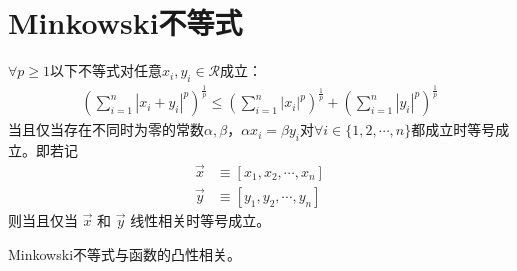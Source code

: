 
\chapter{Minkowski不等式}
\label{chap:minkowski-inequality}


\begin{theorem}[Minkowski不等式]
  $\forall p\ge 1$以下不等式对任意$x_i,y_i\in\mathcal{R}$成立：
  \begin{align}
    \left(\sum_{i=1}^{n}\left|x_i+y_i\right|^p\right)^\frac{1}{p}
    \le
    \left(\sum_{i=1}^{n}\left|x_i\right|^p\right)^\frac{1}{p}
    +
    \left(\sum_{i=1}^{n}\left|y_i\right|^p\right)^\frac{1}{p}
  \end{align}
  当且仅当存在不同时为零的常数$\alpha,\beta$，$\alpha x_i=\beta
  y_i$对$\forall i\in\{1,2,\cdots,n\}$都成立时等号成立。即若记
  \begin{align*}
    \vec{x}&\equiv\left[x_1,x_2,\cdots,x_n\right]\\
    \vec{y}&\equiv\left[y_1,y_2,\cdots,y_n\right]
  \end{align*}
  则当且仅当 $\vec{x}$ 和 $\vec{y}$ 线性相关时等号成立。
\end{theorem}

Minkowski不等式与函数的凸性相关。


